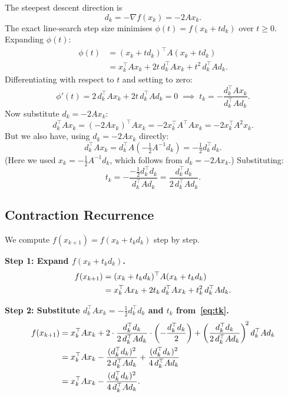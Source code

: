 \documentclass[11pt]{article}
\theoremstyle{definition}
\theoremstyle{plain}
\newcommand{\grad}{\nabla}
\begin{document}
The steepest descent direction is
\[
  d_k = -\grad f(x_k) = -2Ax_k.
\]
The exact line-search step size minimises $\phi(t)=f(x_k+td_k)$ over $t\geq 0$.
Expanding $\phi(t)$:
\begin{align*}
  \phi(t) &= (x_k+td_k)^\top A(x_k+td_k)\\
          &= x_k^\top Ax_k + 2t\,d_k^\top Ax_k + t^2\,d_k^\top Ad_k.
\end{align*}
Differentiating with respect to $t$ and setting to zero:
\[
  \phi'(t) = 2\,d_k^\top Ax_k + 2t\,d_k^\top Ad_k = 0
  \;\implies\;
  t_k = -\frac{d_k^\top Ax_k}{d_k^\top Ad_k}.
\]
Now substitute $d_k = -2Ax_k$:
\[
  d_k^\top Ax_k = (-2Ax_k)^\top Ax_k = -2x_k^\top A^\top Ax_k = -2x_k^\top A^2x_k.
\]
But we also have, using $d_k=-2Ax_k$ directly:
\[
  d_k^\top Ax_k = d_k^\top A\!\left(-\tfrac{1}{2}A^{-1}d_k\right) = -\tfrac{1}{2}d_k^\top d_k.
\]
(Here we used $x_k = -\tfrac{1}{2}A^{-1}d_k$, which follows from $d_k=-2Ax_k$.)
Substituting:
\begin{equation}\label{eq:tk}
  t_k = -\frac{-\tfrac{1}{2}d_k^\top d_k}{d_k^\top Ad_k}
      = \frac{d_k^\top d_k}{2\,d_k^\top Ad_k}.
\end{equation}

\subsection{Contraction Recurrence}

We compute $f(x_{k+1}) = f(x_k + t_k d_k)$ step by step.

\medskip\noindent\textbf{Step 1: Expand $f(x_k+t_kd_k)$.}
\begin{align}
  f(x_{k+1})
  &= (x_k+t_kd_k)^\top A(x_k+t_kd_k) \notag\\
  &= x_k^\top Ax_k + 2t_k\,d_k^\top Ax_k + t_k^2\,d_k^\top Ad_k. \label{eq:fk_step1}
\end{align}

\medskip\noindent\textbf{Step 2: Substitute $d_k^\top Ax_k = -\tfrac{1}{2}d_k^\top d_k$ and $t_k$ from~\eqref{eq:tk}.}
\begin{align}
  f(x_{k+1})
  &= x_k^\top Ax_k + 2\cdot\frac{d_k^\top d_k}{2\,d_k^\top Ad_k}\cdot\left(-\frac{d_k^\top d_k}{2}\right)
     + \left(\frac{d_k^\top d_k}{2\,d_k^\top Ad_k}\right)^{\!2} d_k^\top Ad_k \notag\\
  &= x_k^\top Ax_k - \frac{(d_k^\top d_k)^2}{2\,d_k^\top Ad_k}
     + \frac{(d_k^\top d_k)^2}{4\,d_k^\top Ad_k} \notag\\
  &= x_k^\top Ax_k - \frac{(d_k^\top d_k)^2}{4\,d_k^\top Ad_k}. \label{eq:fk_expand}
\end{align}
\end{document}
